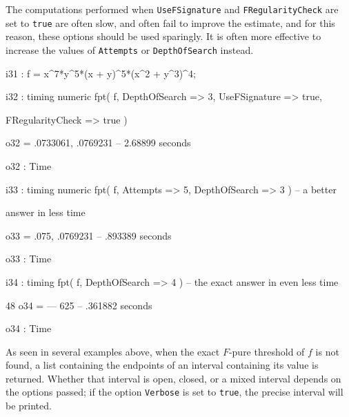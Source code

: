 \documentclass{amsart}
\begin{document}
The computations performed when {\tt UseFSignature} and {\tt FRegularityCheck} are set to {\tt true} are often slow, and often fail to improve the estimate, and for this reason, these options should be used sparingly.
            It is often more effective to increase the values of {\tt Attempts} or {\tt DepthOfSearch} instead.

{\small
{}
\begin{MyVerbatim}

i31 : f = x^7*y^5*(x + y)^5*(x^2 + y^3)^4;

i32 : timing numeric fpt( f, DepthOfSearch => 3, UseFSignature => true,

      FRegularityCheck => true )

o32 = {.0733061, .0769231}
      -- 2.68899 seconds

o32 : Time

i33 : timing numeric fpt( f, Attempts => 5, DepthOfSearch => 3 ) -- a better

      answer in less time

o33 = {.075, .0769231}
      -- .893389 seconds

o33 : Time

i34 : timing fpt( f, DepthOfSearch => 4 ) -- the exact answer in even less
      time

       48
o34 = ---
      625
      -- .361882 seconds

o34 : Time

\end{MyVerbatim}
}

As seen in several examples above, when the exact  $F$-pure threshold of $f$ is not found, a list containing the endpoints of an interval containing its value is returned.  Whether that interval is open, closed, or a mixed interval depends on the options passed; if the option {\tt Verbose} is set to {\tt true}, the precise interval will be printed.
\end{document}
